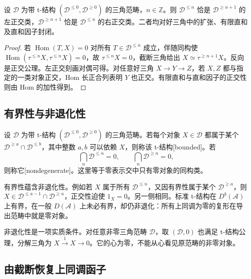 \begin{proposition}\label{b4:prop:t-orthogonals-extensions}
	设 \(\mathcal D\) 为带 t-结构 \((\mathcal D^{\le0},\mathcal D^{\ge0})\) 的三角范畴，\(n\in\mathbb Z\)。则 \(\mathcal D^{\le n}\) 恰是 \(\mathcal D^{\ge n+1}\) 的左正交类，\(\mathcal D^{\ge n+1}\) 恰是 \(\mathcal D^{\le n}\) 的右正交类。二者均对好三角中的扩张、有限直和及直和因子封闭。
\end{proposition}
\begin{proof}
	若 \(\operatorname{Hom}(T,X)=0\) 对所有 \(T\in\mathcal D^{\le n}\) 成立，伴随同构使 \(\operatorname{Hom}(\tau^{\le n}X,\tau^{\le n}X)=0\)，故 \(\tau^{\le n}X=0\)，截断三角给出 \(X\simeq\tau^{\ge n+1}X\)。反向是正交公理。左正交刻画对偶可得。对任意好三角 \(X\to Y\to Z\)，若 \(X,Z\) 都与指定的一类对象正交，Hom 长正合列表明 \(Y\) 也正交。有限直和与直和因子的正交性则由 Hom 的加性得到。
\end{proof}

\subsection{有界性与非退化性}
\label{b4:subsec:1902:02}

\begin{definition}\label{b4:def:bounded-nondegenerate-t}
	设 \(\mathcal D\) 为带 t-结构 \((\mathcal D^{\le0},\mathcal D^{\ge0})\) 的三角范畴。若每个对象 \(X\in\mathcal D\) 都属于某个 \(\mathcal D^{\ge a}\cap\mathcal D^{\le b}\)，其中整数 \(a,b\) 可以依赖 \(X\)，则称该 t-结构[bounded]。若
	\[
		\bigcap_n\mathcal D^{\le n}=0,\qquad \bigcap_n\mathcal D^{\ge n}=0,
	\]
	则称它[nondegenerate]。这里等于零表示交中只有零对象的同构类。
\end{definition}

有界性蕴含非退化性。例如若 \(X\) 属于所有 \(\mathcal D^{\le n}\)，又因有界性属于某个 \(\mathcal D^{\ge a}\)，则 \(X\in\mathcal D^{\le a-1}\cap\mathcal D^{\ge a}\)，正交性迫使 \(1_X=0\)。另一侧相同。标准 t-结构在 \(D^b(\mathcal A)\) 上有界，在一般 \(D(\mathcal A)\) 上未必有界，却仍非退化：所有上同调为零的复形在导出范畴中就是零对象。

\ProseParagraphBreak
非退化性是一项实质条件。对任意非零三角范畴 \(\mathcal D\)，取 \((\mathcal D,0)\) 也满足 t-结构公理，分解三角为 \(X\xrightarrow{1}X\to0\)。它的心为零，不能从心看见原范畴的非零对象。

\subsection{由截断恢复上同调函子}
\label{b4:subsec:1902:03}

